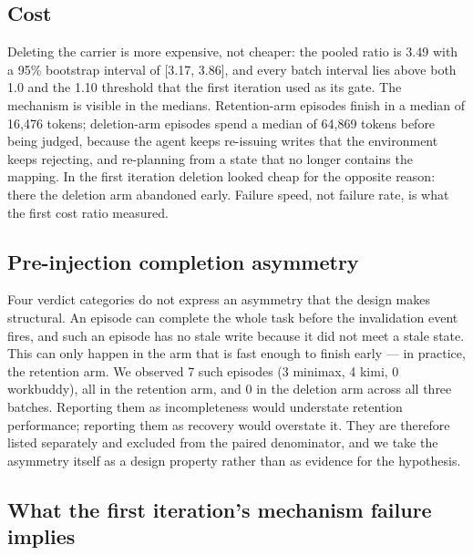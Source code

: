 \documentclass[11pt]{article}
\begin{document}
\begin{sloppypar}
\subsection{Cost}

Deleting the carrier is more expensive, not cheaper: the pooled ratio is 3.49 with a 95\% bootstrap interval of [3.17, 3.86], and every batch interval lies above both 1.0 and the 1.10 threshold that the first iteration used as its gate. The mechanism is visible in the medians. Retention-arm episodes finish in a median of 16{,}476 tokens; deletion-arm episodes spend a median of 64{,}869 tokens before being judged, because the agent keeps re-issuing writes that the environment keeps rejecting, and re-planning from a state that no longer contains the mapping. In the first iteration deletion looked cheap for the opposite reason: there the deletion arm abandoned early. Failure speed, not failure rate, is what the first cost ratio measured.

\subsection{Pre-injection completion asymmetry}

Four verdict categories do not express an asymmetry that the design makes structural. An episode can complete the whole task before the invalidation event fires, and such an episode has no stale write because it did not meet a stale state. This can only happen in the arm that is fast enough to finish early --- in practice, the retention arm. We observed 7 such episodes (3 minimax, 4 kimi, 0 workbuddy), all in the retention arm, and 0 in the deletion arm across all three batches. Reporting them as incompleteness would understate retention performance; reporting them as recovery would overstate it. They are therefore listed separately and excluded from the paired denominator, and we take the asymmetry itself as a design property rather than as evidence for the hypothesis.

\subsection{What the first iteration's mechanism failure implies}


\end{sloppypar}
\end{document}
